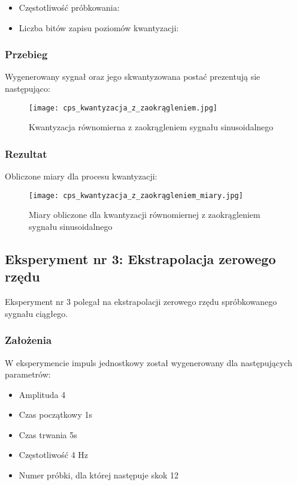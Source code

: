 \documentclass[12pt]{article}
\begin{document}
\begin{itemize}
	\item Częstotliwość próbkowania:
	\item Liczba bitów zapisu poziomów kwantyzacji:
\end{itemize}
\subsubsection{Przebieg}
Wygenerowany sygnał oraz jego skwantyzowana postać prezentują sie następująco:
\begin{figure}[H]
	\centering
	\texttt{[image: cps\_kwantyzacja\_z\_zaokrągleniem.jpg]}
	\caption{Kwantyzacja równomierna z zaokrągleniem sygnału sinusoidalnego}
	\label{wykres dla eksperymentu 2}
\end{figure}

\subsubsection{Rezultat}
Obliczone miary dla procesu kwantyzacji:
\begin{figure}[H]
	\centering
	\texttt{[image: cps\_kwantyzacja\_z\_zaokrągleniem\_miary.jpg]}
	\caption{Miary obliczone dla kwantyzacji równomiernej z zaokrągleniem sygnału sinusoidalnego}
	\label{Wartości dla eksperymentu 2}
\end{figure}



\newpage
\subsection{Eksperyment nr 3: Ekstrapolacja zerowego rzędu}

Eksperyment nr 3 polegał na ekstrapolacji zerowego rzędu spróbkowanego sygnału ciągłego.
\subsubsection{Założenia}
W eksperymencie impuls jednostkowy został wygenerowany dla następujących parametrów:
\begin{itemize}
    \item Amplituda 4
    \item Czas początkowy 1s
    \item Czas trwania 5s
    \item Częstotliwość 4 Hz
    \item Numer próbki, dla której następuje skok 12
\end{itemize}
\end{document}
